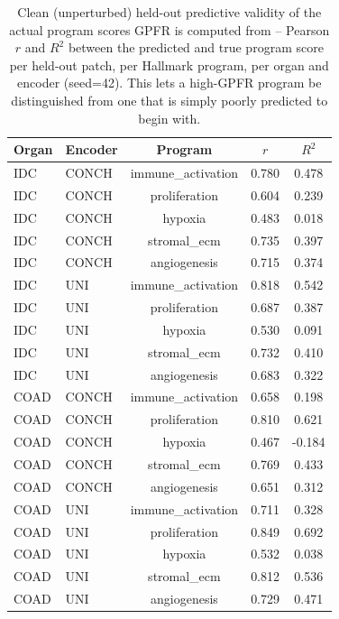 \begin{table}[t]
\centering
\caption{Clean (unperturbed) held-out predictive validity of the actual program scores GPFR is computed from -- Pearson $r$ and $R^2$ between the predicted and true program score per held-out patch, per Hallmark program, per organ and encoder (seed=42). This lets a high-GPFR program be distinguished from one that is simply poorly predicted to begin with.}
\label{tab:program_validity}
\begin{tabular}{llccc}
\toprule
Organ & Encoder & Program & $r$ & $R^2$ \\
\midrule
IDC & CONCH & immune\_activation & 0.780 & 0.478 \\
IDC & CONCH & proliferation & 0.604 & 0.239 \\
IDC & CONCH & hypoxia & 0.483 & 0.018 \\
IDC & CONCH & stromal\_ecm & 0.735 & 0.397 \\
IDC & CONCH & angiogenesis & 0.715 & 0.374 \\
IDC & UNI & immune\_activation & 0.818 & 0.542 \\
IDC & UNI & proliferation & 0.687 & 0.387 \\
IDC & UNI & hypoxia & 0.530 & 0.091 \\
IDC & UNI & stromal\_ecm & 0.732 & 0.410 \\
IDC & UNI & angiogenesis & 0.683 & 0.322 \\
COAD & CONCH & immune\_activation & 0.658 & 0.198 \\
COAD & CONCH & proliferation & 0.810 & 0.621 \\
COAD & CONCH & hypoxia & 0.467 & -0.184 \\
COAD & CONCH & stromal\_ecm & 0.769 & 0.433 \\
COAD & CONCH & angiogenesis & 0.651 & 0.312 \\
COAD & UNI & immune\_activation & 0.711 & 0.328 \\
COAD & UNI & proliferation & 0.849 & 0.692 \\
COAD & UNI & hypoxia & 0.532 & 0.038 \\
COAD & UNI & stromal\_ecm & 0.812 & 0.536 \\
COAD & UNI & angiogenesis & 0.729 & 0.471 \\
\bottomrule
\end{tabular}
\end{table}
